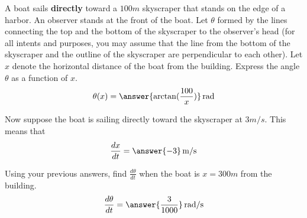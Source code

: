 \documentclass{ximera}
\begin{document}
\begin{exercise}
A boat sails \textbf{directly} toward a $100\unit{m}$ skyscraper that stands on the edge of a harbor. An observer stands at the front of the boat. Let $\theta$ formed by the lines connecting the top and the bottom of the skyscraper to the observer's head (for all intents and purposes, you may assume that the line from the bottom of the skyscraper and the outline of the skyscraper are perpendicular to each other). Let $x$ denote the horizontal distance of the boat from the building. Express the angle $\theta$ as a function of $x$.
\[
\theta(x)=\answer{\arctan(\frac{100}{x})}\unit{rad}
\]
\begin{exercise}
Now suppose the boat is sailing directly toward the skyscraper at $3\unit{m/s}$. This means that
\[
\frac{dx}{dt}=\answer{-3}\unit{m/s}
\]
\begin{exercise}
Using your previous answers, find $\frac{d\theta}{dt}$ when the boat is $x=300\unit{m}$ from the building.
\[
\frac{d\theta}{dt}=\answer{\frac{3}{1000}}\unit{rad/s}
\]
\end{exercise}
\end{exercise}
\end{exercise}
\end{document}
